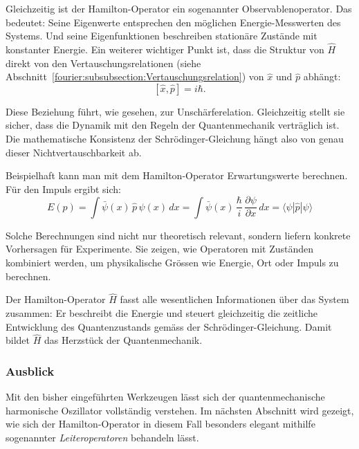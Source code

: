 Gleichzeitig ist der Hamilton-Operator ein sogenannter Observablenoperator.
%
Das bedeutet:
Seine Eigenwerte entsprechen den möglichen Energie-Messwerten des Systems.
Und seine Eigenfunktionen beschreiben stationäre Zustände mit konstanter Energie.
Ein weiterer wichtiger Punkt ist, dass die Struktur von \( \hat{H} \) direkt von den Vertauschungsrelationen
(siehe Abschnitt~\ref{fourier:subsubsection:Vertauschungsrelation}) von \( \hat{x} \) und \( \hat{p} \) abhängt:
\begin{equation}\label{fourier:equation:Vertauschungsrelation_x_p}
	[\hat{x}, \hat{p}] = i \hbar.
\end{equation}

Diese Beziehung führt, wie gesehen, zur Unschärferelation.
Gleichzeitig stellt sie sicher, dass die Dynamik mit den Regeln der Quantenmechanik verträglich ist.
Die mathematische Konsistenz der Schrödinger-Gleichung hängt also von genau dieser Nichtvertauschbarkeit ab.

Beispielhaft kann man mit dem Hamilton-Operator Erwartungswerte berechnen.
Für den Impuls ergibt sich:
\begin{equation}
	E(p) = \int \bar{\psi}(x) \, \hat{p} \, \psi(x) \, dx 
	= \int \bar{\psi}(x) \, \frac{\hbar}{i} \, \frac{\partial \psi}{\partial x} \, dx 
	= \langle \psi | \hat{p} | \psi \rangle
\end{equation}


Solche Berechnungen sind nicht nur theoretisch relevant, sondern liefern konkrete Vorhersagen für Experimente.
Sie zeigen, wie Operatoren mit Zuständen kombiniert werden, um physikalische Grössen wie Energie, Ort oder Impuls zu berechnen.

Der Hamilton-Operator $\hat{H}$ fasst alle wesentlichen Informationen über das System zusammen:
Er beschreibt die Energie und steuert gleichzeitig die zeitliche Entwicklung des Quantenzustands gemäss der Schrödinger-Gleichung.
Damit bildet $\hat{H}$ das Herzstück der Quantenmechanik.

\subsubsection{Ausblick\label{fourier:subsubsection:Ausblick}}
Mit den bisher eingeführten Werkzeugen lässt sich der quantenmechanische harmonische Oszillator vollständig verstehen.
Im nächsten Abschnitt wird gezeigt, wie sich der Hamilton-Operator in diesem Fall besonders elegant mithilfe sogenannter \emph{Leiteroperatoren} behandeln lässt.
%

